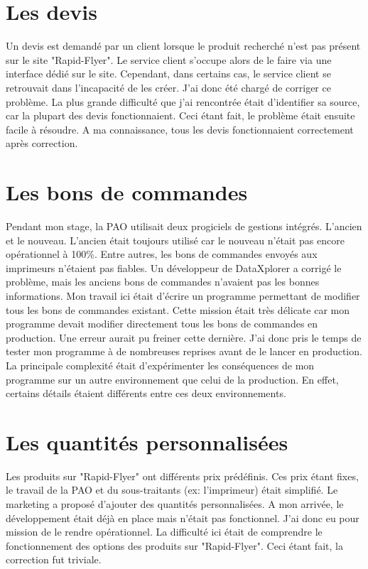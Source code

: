 \section{Les devis}
Un devis est demandé par un client lorsque le produit recherché n'est pas présent sur le site "Rapid-Flyer". Le service client s'occupe alors de le faire via une interface dédié sur le site. Cependant, dans certains cas, le service client se retrouvait dans l'incapacité de les créer.\newline
J'ai donc été chargé de corriger ce problème. La plus grande difficulté que j'ai rencontrée était d'identifier sa source, car la plupart des devis fonctionnaient. Ceci étant fait, le problème était ensuite facile à résoudre. A ma connaissance, tous les devis fonctionnaient correctement après correction.

\section{Les bons de commandes}
Pendant mon stage, la PAO utilisait deux progiciels de gestions intégrés. L'ancien et le nouveau. L'ancien était toujours utilisé car le nouveau n'était pas encore opérationnel à 100\%. Entre autres, les bons de commandes envoyés aux imprimeurs n'étaient pas fiables. Un développeur de DataXplorer a corrigé le problème, mais les anciens bons de commandes n'avaient pas les bonnes informations. Mon travail ici était d'écrire un programme permettant de modifier tous les bons de commandes existant. Cette mission était très délicate car mon programme devait modifier directement tous les bons de commandes en production. Une erreur aurait pu freiner cette dernière. J'ai donc pris le temps de tester mon programme à de nombreuses reprises avant de le lancer en production. La principale complexité était d'expérimenter les conséquences de mon programme sur un autre environnement que celui de la production. En effet, certains détails étaient différents entre ces deux environnements.

\section{Les quantités personnalisées}
Les produits sur "Rapid-Flyer" ont différents prix prédéfinis. Ces prix étant fixes, le travail de la PAO et du sous-traitants (ex: l'imprimeur) était simplifié.\newline
Le marketing a proposé d'ajouter des quantités personnalisées. A mon arrivée, le développement était déjà en place mais n'était pas fonctionnel. J'ai donc eu pour mission de le rendre opérationnel. La difficulté ici était de comprendre le fonctionnement des options des produits sur "Rapid-Flyer". Ceci étant fait, la correction fut triviale.

